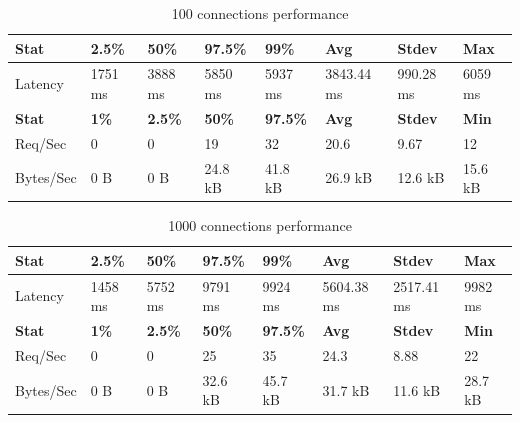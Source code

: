 \documentclass[../Main.tex]{subfiles}
\begin{document}
\begin{table}[H]
  \centering
\begin{tabular}{|l|l|l|l|l|l|l|l|}
\hline
\rowcolor[HTML]{f56b00}
\textbf{Stat} & \textbf{2.5\%} & \textbf{50\%} & \textbf{97.5\%} & \textbf{99\%} & \textbf{Avg} & \textbf{Stdev} & \textbf{Max} \\
\hline
Latency   & 1751 ms & 3888 ms & 5850 ms & 5937 ms & 3843.44 ms & 990.28 ms & 6059 ms \\
\hline
\rowcolor[HTML]{f56b00}
\textbf{Stat} & \textbf{1\%} & \textbf{2.5\%} & \textbf{50\%} & \textbf{97.5\%} & \textbf{Avg} & \textbf{Stdev} & \textbf{Min} \\
Req/Sec   & 0  & 0  & 19   & 32   & 20.6  & 9.67 & 12  \\
\hline
Bytes/Sec & 0 B & 0 B & 24.8 kB & 41.8 kB & 26.9 kB & 12.6 kB & 15.6 kB \\
\hline
\end{tabular}
 \caption{100 connections performance}
 \label{100-connections-performance}
\end{table}

\begin{table}[H]
  \centering
\begin{tabular}{|l|l|l|l|l|l|l|l|}
\hline
\rowcolor[HTML]{f56b00}
\textbf{Stat} & \textbf{2.5\%} & \textbf{50\%} & \textbf{97.5\%} & \textbf{99\%} & \textbf{Avg} & \textbf{Stdev} & \textbf{Max} \\
\hline
Latency   & 1458 ms & 5752 ms & 9791 ms & 9924 ms & 5604.38 ms & 2517.41 ms & 9982 ms \\
\hline
\rowcolor[HTML]{f56b00}
\textbf{Stat} & \textbf{1\%} & \textbf{2.5\%} & \textbf{50\%} & \textbf{97.5\%} & \textbf{Avg} & \textbf{Stdev} & \textbf{Min} \\
Req/Sec   & 0  & 0  & 25   & 35   & 24.3  & 8.88 & 22  \\
\hline
Bytes/Sec & 0 B & 0 B & 32.6 kB & 45.7 kB & 31.7 kB & 11.6 kB & 28.7 kB \\
\hline
\end{tabular}
 \caption{1000 connections performance}
 \label{1000-connections-performance}
\end{table}
\end{document}
